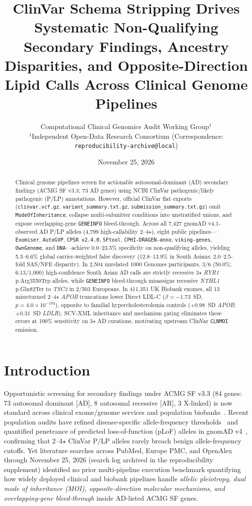 \documentclass[11pt,letterpaper]{article}
\title{\textbf{ClinVar Schema Stripping Drives Systematic Non-Qualifying Secondary Findings, Ancestry Disparities, and Opposite-Direction Lipid Calls Across Clinical Genome Pipelines}}
\author{
  Computational Clinical Genomics Audit Working Group$^{1}$\\
  \small $^{1}$Independent Open-Data Research Consortium (Correspondence: \texttt{reproducibility-archive@local})
}
\date{November 25, 2026}
\begin{document}
\maketitle

\begin{abstract}
\noindent
Clinical genome pipelines screen for actionable autosomal-dominant (AD) secondary findings (ACMG SF v3.3; 73 AD genes) using NCBI ClinVar pathogenic/likely pathogenic (P/LP) annotations. However, official ClinVar flat exports (\texttt{clinvar.vcf.gz}, \texttt{variant\_summary.txt.gz}, \texttt{submission\_summary.txt.gz}) omit \texttt{ModeOfInheritance}, collapse multi-submitter conditions into unstratified unions, and expose overlapping-gene \texttt{GENEINFO} bleed-through. Across all 7,427 gnomAD v4.1-observed AD P/LP alleles (4,799 high-callability 2--4$\star$), eight public pipelines---\texttt{Exomiser}, \texttt{AutoGVP}, \texttt{CPSR v2.4.0}, \texttt{SFtool}, \texttt{CPHI-DRAGEN-anno}, \texttt{viking-genes}, \texttt{OwnGenome}, and \texttt{DNA}---achieve 0.0--23.5\% specificity on non-qualifying alleles, yielding 5.3--6.6\% global carrier-weighted false discovery (12.8--13.9\% in South Asians; 2.0--2.5-fold SAS/NFE disparity). In 2,504 unrelated 1000 Genomes participants, 3/6 (50.0\%; 6.13/1,000) high-confidence South Asian AD calls are strictly recessive 3$\star$ \textit{RYR1} p.Arg3550Trp alleles, while \texttt{GENEINFO} bleed-through misassigns recessive \textit{NTHL1} p.Gln82Ter to \textit{TSC2} in 2/503 Europeans. In 411,351 UK Biobank exomes, all 13 misreturned 2--4$\star$ \textit{APOB} truncations lower Direct LDL-C ($\beta = -1.73$~SD, $p = 4.0\times 10^{-194}$), opposite to familial hypercholesterolemia controls ($+0.98$~SD \textit{APOB}; $+0.31$~SD \textit{LDLR}). SCV-XML inheritance and mechanism gating eliminates these errors at 100\% sensitivity on 3$\star$ AD curations, motivating upstream ClinVar \texttt{CLNMOI} emission.
\end{abstract}

\section{Introduction}
Opportunistic screening for secondary findings under ACMG SF v3.3 (84 genes: 73 autosomal dominant [AD], 8 autosomal recessive [AR], 3 X-linked) is now standard across clinical exome/genome services and population biobanks~\citep{lee2025acmgsf33,kerr2025viking}. Recent population audits have refined disease-specific allele-frequency thresholds~\citep{johnston2026daft} and quantified penetrance of predicted loss-of-function (pLoF) alleles in gnomAD v4~\citep{gudmundsson2025gnomad}, confirming that 2--4$\star$ ClinVar P/LP alleles rarely breach benign allele-frequency cutoffs. Yet literature searches across PubMed, Europe PMC, and OpenAlex through November 25, 2026 (search log archived in the reproducibility supplement) identified no prior multi-pipeline execution benchmark quantifying how widely deployed clinical and biobank pipelines handle \textit{allelic pleiotropy, dual mode of inheritance (MOI), opposite-direction molecular mechanisms, and overlapping-gene bleed-through} inside AD-listed ACMG SF genes.
\end{document}
